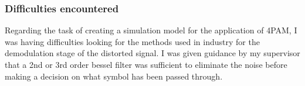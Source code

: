 \subsubsection{Difficulties encountered}

Regarding the task of creating a simulation model for the application of 4PAM, I was having difficulties looking for the methods used in industry for the demodulation stage of the distorted signal. I was given guidance by my supervisor that a 2nd or 3rd order bessel filter was sufficient to eliminate the noise before making a decision on what symbol has been passed through.